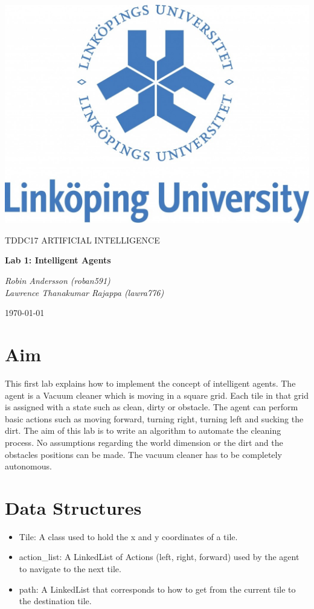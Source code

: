 \documentclass[a4paper,10pt]{article}
\begin{document}
\begin{titlepage}
	\centering
	\includegraphics[width=.6\textwidth]{liu-logo.png}\par
	\vfill
	{\scshape\Large TDDC17 ARTIFICIAL INTELLIGENCE\par}
	{\huge\bfseries Lab 1: Intelligent Agents\par}
	\vspace{1cm}
	{\large\itshape Robin Andersson (roban591) \\ Lawrence Thanakumar Rajappa (lawra776)\par}
	\vfill
	{\large \today\par}
\end{titlepage}

\section{Aim}

This first lab explains how to implement the concept of intelligent agents. 
The agent is a Vacuum cleaner which is moving in a square grid. 
Each tile in that grid is assigned with a state such as clean, dirty or obstacle. 
The agent can perform basic actions such as moving forward, turning right, turning left and sucking the dirt. 
The aim of this lab is to write an algorithm to automate the cleaning process. 
No assumptions regarding the world dimension or the dirt and the obstacles positions can be made. 
The vacuum cleaner has to be completely autonomous.

\section{Data Structures}

\begin{itemize}
	\item Tile: A class used to hold the x and y coordinates of a tile.
	\item action\_list: A LinkedList of Actions (left, right, forward) used by the agent to navigate to the next tile.
	\item path: A LinkedList that corresponds to how to get from the current tile to the destination tile.
\end{itemize}
\end{document}
